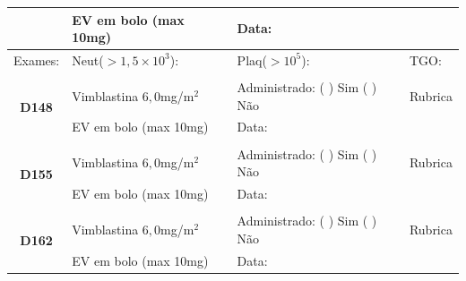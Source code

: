 \documentclass[11pt,a4paper,oldfontcommands]{memoir}
\begin{document}
\begin{center}
\begin{table}[H]
\begin{tabular}{p{}p{}|p{}|p{3cm}}
    \multicolumn{1}{c|}{}&{EV em bolo (max 10mg)}&{Data:}&\\
    \hline
    {Exames:}&{Neut(\(>1,5\times10^3\)):}&{Plaq(\(>10^5\)):}&{TGO:}
    \\
    \hline
    \\
    \hline
    \multicolumn{1}{c|}{\multirow{2}{*}{\textbf{D148}}}&{Vimblastina \(6,0\)mg/m\(^2\)}&{Administrado: (  ) Sim (  ) Não}&{Rubrica}\\
    \multicolumn{1}{c|}{}&{EV em bolo (max 10mg)}&{Data:}&\\
    \hline
    \\
    \hline
    \multicolumn{1}{c|}{\multirow{2}{*}{\textbf{D155}}}&{Vimblastina \(6,0\)mg/m\(^2\)}&{Administrado: (  ) Sim (  ) Não}&{Rubrica}\\
    \multicolumn{1}{c|}{}&{EV em bolo (max 10mg)}&{Data:}&\\
    \hline
    \\
    \hline
    \multicolumn{1}{c|}{\multirow{2}{*}{\textbf{D162}}}&{Vimblastina \(6,0\)mg/m\(^2\)}&{Administrado: (  ) Sim (  ) Não}&{Rubrica}\\
    \multicolumn{1}{c|}{}&{EV em bolo (max 10mg)}&{Data:}&\\
    \hline


\end{tabular}
\end{table}
\end{center}
\end{document}
